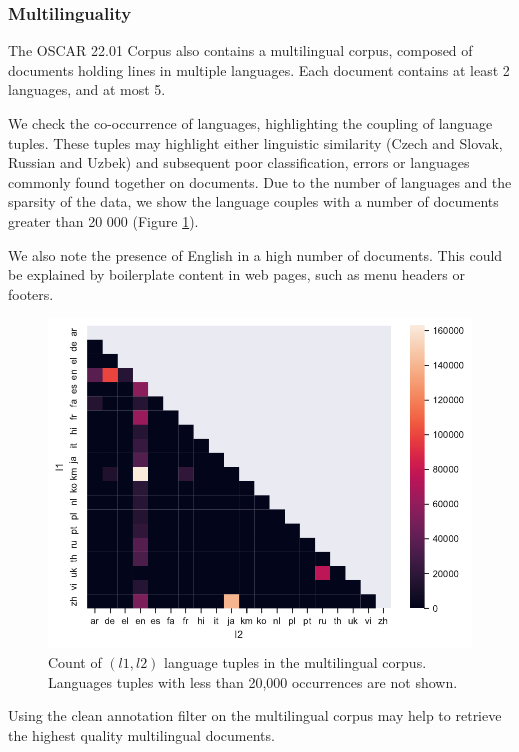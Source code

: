 \subsubsection{Multilinguality}

The OSCAR 22.01 Corpus also contains a multilingual corpus, composed of documents holding lines in multiple languages. Each document contains at least 2 languages, and at most 5.

We check the co-occurrence of languages, highlighting the coupling of language tuples. These tuples may highlight either linguistic similarity (Czech and Slovak, Russian and Uzbek) and subsequent poor classification, errors or languages commonly found together on documents. Due to the number of languages and the sparsity of the data, we show the language couples with a number of documents greater than 20 000 (Figure \ref{multi-confusion}).

We also note the presence of English in a high number of documents. This could be explained by boilerplate content in web pages, such as menu headers or footers.


\begin{figure}[!ht]
    \begin{center}
        \includegraphics[width=0.8\linewidth]{static/media/oscar/towards/multilingual_big}
        \caption{Count of $(l1, l2)$ language tuples in the multilingual corpus. Languages tuples with less than 20,000 occurrences are not shown.}
        \label{multi-confusion}
    \end{center}
\end{figure}

Using the clean annotation filter on the multilingual corpus may help to retrieve the highest quality multilingual documents.

